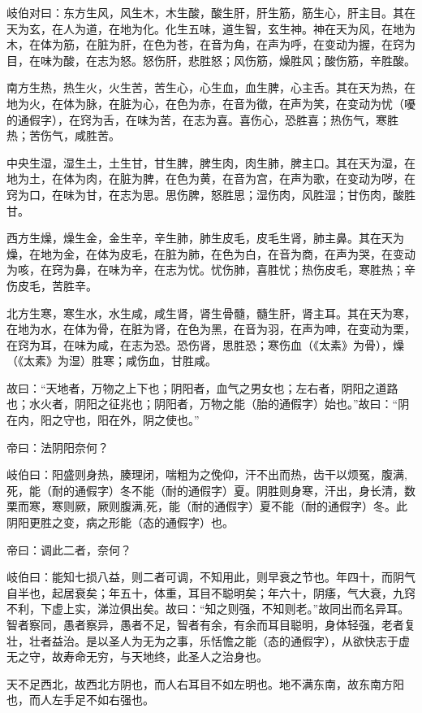 \documentclass{article}%
\begin{document}
岐伯对曰：东方生风，风生木，木生酸，酸生肝，肝生筋，筋生心，肝主目。其在天为玄，在人为道，在地为化。化生五味，道生智，玄生神。神在天为风，在地为木，在体为筋，在脏为肝，在色为苍，在音为角，在声为呼，在变动为握，在窍为目，在味为酸，在志为怒。怒伤肝，悲胜怒；风伤筋，燥胜风；酸伤筋，辛胜酸。

南方生热，热生火，火生苦，苦生心，心生血，血生脾，心主舌。其在天为热，在地为火，在体为脉，在脏为心，在色为赤，在音为徵，在声为笑，在变动为忧（嚘的通假字），在窍为舌，在味为苦，在志为喜。喜伤心，恐胜喜；热伤气，寒胜热；苦伤气，咸胜苦。

中央生湿，湿生土，土生甘，甘生脾，脾生肉，肉生肺，脾主口。其在天为湿，在地为土，在体为肉，在脏为脾，在色为黄，在音为宫，在声为歌，在变动为哕，在窍为口，在味为甘，在志为思。思伤脾，怒胜思；湿伤肉，风胜湿；甘伤肉，酸胜甘。

西方生燥，燥生金，金生辛，辛生肺，肺生皮毛，皮毛生肾，肺主鼻。其在天为燥，在地为金，在体为皮毛，在脏为肺，在色为白，在音为商，在声为哭，在变动为咳，在窍为鼻，在味为辛，在志为忧。忧伤肺，喜胜忧；热伤皮毛，寒胜热；辛伤皮毛，苦胜辛。

北方生寒，寒生水，水生咸，咸生肾，肾生骨髓，髓生肝，肾主耳。其在天为寒，在地为水，在体为骨，在脏为肾，在色为黑，在音为羽，在声为呻，在变动为栗，在窍为耳，在味为咸，在志为恐。恐伤肾，思胜恐；寒伤血（《太素》为骨），燥（《太素》为湿）胜寒；咸伤血，甘胜咸。

故曰：“天地者，万物之上下也；阴阳者，血气之男女也；左右者，阴阳之道路也；水火者，阴阳之征兆也；阴阳者，万物之能（胎的通假字）始也。”故曰：“阴在内，阳之守也，阳在外，阴之使也。”

帝曰：法阴阳奈何？

岐伯曰：阳盛则身热，腠理闭，喘粗为之俛仰，汗不出而热，齿干以烦冤，腹满,死，能（耐的通假字）冬不能（耐的通假字）夏。阴胜则身寒，汗出，身长清，数栗而寒，寒则厥，厥则腹满,死，能（耐的通假字）夏不能（耐的通假字）冬。此阴阳更胜之变，病之形能（态的通假字）也。

帝曰：调此二者，奈何？

岐伯曰：能知七损八益，则二者可调，不知用此，则早衰之节也。年四十，而阴气自半也，起居衰矣；年五十，体重，耳目不聪明矣；年六十，阴痿，气大衰，九窍不利，下虚上实，涕泣俱出矣。故曰：“知之则强，不知则老。”故同出而名异耳。智者察同，愚者察异，愚者不足，智者有余，有余而耳目聪明，身体轻强，老者复壮，壮者益治。是以圣人为无为之事，乐恬憺之能（态的通假字），从欲快志于虚无之守，故寿命无穷，与天地终，此圣人之治身也。

天不足西北，故西北方阴也，而人右耳目不如左明也。地不满东南，故东南方阳也，而人左手足不如右强也。
\end{document}
